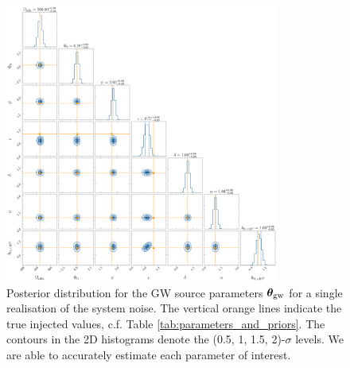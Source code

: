 \documentclass[fleqn,usenatbib,useAMS]{mnras}
\begin{document}
\begin{figure}
	\includegraphics[width=0.8\textwidth, height =0.8\textwidth ]{images/representative_example_v2_GW}
	\caption{Posterior distribution for the GW source parameters $\boldsymbol{\theta}_{\rm gw}$ for a single realisation of the system noise. The vertical orange lines indicate the true injected values, c.f. Table \ref{tab:parameters_and_priors}. The contours in the 2D histograms denote the (0.5, 1, 1.5, 2)-$\sigma$ levels. We are able to accurately estimate each parameter of interest.}
	\label{fig:corner_plot_1}
\end{figure}
\end{document}
